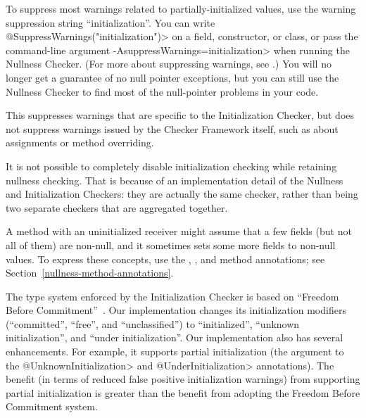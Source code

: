 
To suppress most warnings related to partially-initialized values, use the
warning suppression string ``initialization''.
You can write \<@SuppressWarnings("initialization")>
on a field, constructor, or
class, or pass the command-line argument
\<-AsuppressWarnings=initialization> when
running the Nullness Checker.
(For more about suppressing warnings, see
.)  You will no longer get a guarantee
of no null pointer exceptions, but you can still use the Nullness Checker
to find most of the null-pointer problems in your code.

This suppresses warnings that are specific to the Initialization Checker,
but does not suppress warnings issued by the Checker Framework itself, such
as about assignments or method overriding.

It is not possible to completely disable initialization checking while
retaining nullness checking.  That is because
of an implementation detail of the Nullness and Initialization Checkers:
they are actually the same checker, rather than being two separate checkers
that are aggregated together.





A method with an uninitialized receiver might assume that a few fields (but not all
of them) are non-null, and it sometimes sets some more fields to non-null
values.  To express these concepts, use the
,
, and
 method annotations;
see Section~\ref{nullness-method-annotations}.



The type system enforced by the Initialization Checker is based on
``Freedom Before Commitment''~\cite{SummersM2011}.  Our implementation
changes its initialization modifiers (``committed'', ``free'', and
``unclassified'') to ``initialized'', ``unknown initialization'', and
``under initialization''.  Our implementation also has several
enhancements.  For example, it supports partial initialization (the
argument to the \<@UnknownInitialization> and \<@UnderInitialization>
annotations).  The benefit (in terms of reduced false positive
initialization warnings) from supporting partial initialization is
greater than the benefit from adopting the Freedom Before Commitment system.



